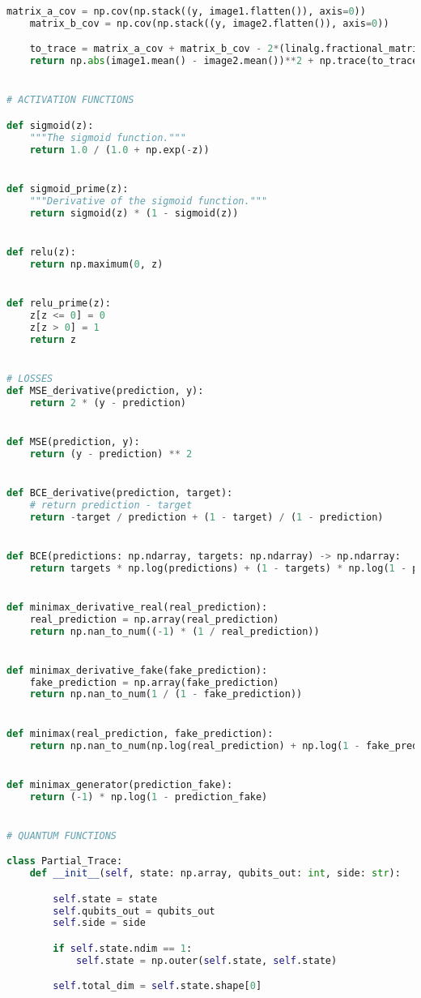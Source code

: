 \begin{lstlisting}[language=Python, caption=Funcions varies]
	matrix_a_cov = np.cov(np.stack((y, image1.flatten()), axis=0))
	matrix_b_cov = np.cov(np.stack((y, image2.flatten()), axis=0))

	to_trace = matrix_a_cov + matrix_b_cov - 2*(linalg.fractional_matrix_power(np.dot(matrix_a_cov, matrix_b_cov), .5))
	return np.abs(image1.mean() - image2.mean())**2 + np.trace(to_trace)


# ACTIVATION FUNCTIONS

def sigmoid(z):
	"""The sigmoid function."""
	return 1.0 / (1.0 + np.exp(-z))


def sigmoid_prime(z):
	"""Derivative of the sigmoid function."""
	return sigmoid(z) * (1 - sigmoid(z))


def relu(z):
	return np.maximum(0, z)


def relu_prime(z):
	z[z <= 0] = 0
	z[z > 0] = 1
	return z


# LOSSES
def MSE_derivative(prediction, y):
	return 2 * (y - prediction)


def MSE(prediction, y):
	return (y - prediction) ** 2


def BCE_derivative(prediction, target):
	# return prediction - target
	return -target / prediction + (1 - target) / (1 - prediction)


def BCE(predictions: np.ndarray, targets: np.ndarray) -> np.ndarray:
	return targets * np.log(predictions) + (1 - targets) * np.log(1 - predictions).mean()


def minimax_derivative_real(real_prediction):
	real_prediction = np.array(real_prediction)
	return np.nan_to_num((-1) * (1 / real_prediction))


def minimax_derivative_fake(fake_prediction):
	fake_prediction = np.array(fake_prediction)
	return np.nan_to_num(1 / (1 - fake_prediction))


def minimax(real_prediction, fake_prediction):
	return np.nan_to_num(np.log(real_prediction) + np.log(1 - fake_prediction))


def minimax_generator(prediction_fake):
	return (-1) * np.log(1 - prediction_fake)


# QUANTUM FUNCTIONS

class Partial_Trace:
	def __init__(self, state: np.array, qubits_out: int, side: str):

		self.state = state
		self.qubits_out = qubits_out
		self.side = side

		if self.state.ndim == 1:
			self.state = np.outer(self.state, self.state)

		self.total_dim = self.state.shape[0]


\end{lstlisting}
